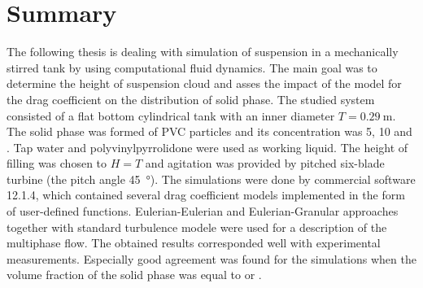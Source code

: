 \section*{Summary}
The following thesis is dealing with simulation of suspension in a mechanically stirred tank by using computational fluid dynamics. The main goal was to determine the height of suspension cloud and asses the impact of the model for the drag coefficient on the distribution of solid phase. The studied system consisted of a flat bottom cylindrical tank with an inner diameter $T=\SI{0.29}{\meter}$. The solid phase was formed of PVC particles and its concentration was 5, 10 and . Tap water and polyvinylpyrrolidone were used as working liquid. The height of filling was chosen to $H=T$ and agitation was provided by pitched six-blade turbine (the pitch angle \SI{45}{\degree}). The simulations were done by commercial software \flu{} 12.1.4, which contained several drag coefficient models implemented in the form of user-defined functions. Eulerian-Eulerian and Eulerian-Granular approaches together with standard \keps{} turbulence modele were used for a description of the multiphase flow. The obtained results corresponded well with experimental measurements. Especially good agreement was found for the simulations when the volume fraction of the solid phase was equal to  or .
